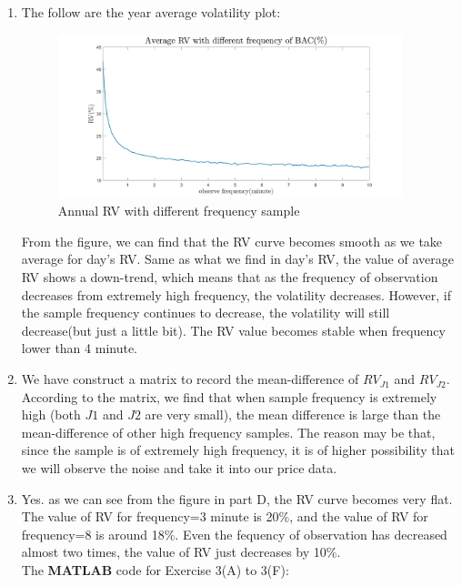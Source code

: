 \documentclass[12pt,letterpaper]{article}
\begin{document}
\begin{enumerate}[label=\textbf{(\Alph*)}]
\item The follow are the year average volatility plot:

\begin{figure}[H]
            \centering
            \includegraphics[width=10cm]{figures/p2_ex3_d_BAC(2015).jpg}
            \caption{Annual RV with different frequency sample}
            \label{fig:8}
        \end{figure}
From the figure, we can find that the RV curve becomes smooth as we take average for day's RV.
Same as what we find in day's RV, the value of average RV shows a down-trend, which means that as the frequency of observation decreases from extremely high frequency, the volatility decreases. However, if the sample frequency continues to decrease, the volatility will still decrease(but just a little bit). The RV value becomes stable when frequency lower than 4 minute.\\

\item We have construct a matrix to record the mean-difference of $RV_{J1}$ and $RV_{J2}$. According to the matrix, we find that when sample frequency is extremely high (both $J1$ and $J2$ are very small), the mean difference is large than the mean-difference of other high frequency samples. The reason may be that, since the sample is of extremely high frequency, it is of higher possibility that we will observe the noise and take it into our price data. \\

\item Yes. as we can see from the figure in part D, the RV curve becomes very flat. The value of RV for frequency=3 minute is 20\%, and the value of RV for frequency=8 is around 18\%. Even the fequency of observation has decreased almost two times, the value of RV just decreases by 10\%. \\

The \textbf{MATLAB} code for Exercise 3(A) to 3(F):
   
   \newpage
   

\end{enumerate}
\end{document}

